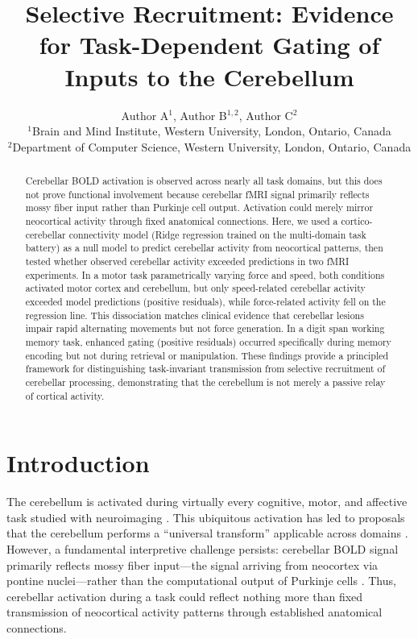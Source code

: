 \documentclass[11pt]{article}
\title{Selective Recruitment: Evidence for Task-Dependent Gating of Inputs to the Cerebellum}
\author{Author A$^{1}$, Author B$^{1,2}$, Author C$^{2}$\\
\small $^{1}$Brain and Mind Institute, Western University, London, Ontario, Canada\\
\small $^{2}$Department of Computer Science, Western University, London, Ontario, Canada}
\date{}
\begin{document}
\maketitle

\begin{abstract}
Cerebellar BOLD activation is observed across nearly all task domains, but this does not prove functional involvement because cerebellar fMRI signal primarily reflects mossy fiber input rather than Purkinje cell output. Activation could merely mirror neocortical activity through fixed anatomical connections. Here, we used a cortico-cerebellar connectivity model (Ridge regression trained on the multi-domain task battery) as a null model to predict cerebellar activity from neocortical patterns, then tested whether observed cerebellar activity exceeded predictions in two fMRI experiments. In a motor task parametrically varying force and speed, both conditions activated motor cortex and cerebellum, but only speed-related cerebellar activity exceeded model predictions (positive residuals), while force-related activity fell on the regression line. This dissociation matches clinical evidence that cerebellar lesions impair rapid alternating movements but not force generation. In a digit span working memory task, enhanced gating (positive residuals) occurred specifically during memory encoding but not during retrieval or manipulation. These findings provide a principled framework for distinguishing task-invariant transmission from selective recruitment of cerebellar processing, demonstrating that the cerebellum is not merely a passive relay of cortical activity.
\end{abstract}

\section{Introduction}

The cerebellum is activated during virtually every cognitive, motor, and affective task studied with neuroimaging \citep{stoodley2012functional, buckner2011organization, schmahmann2019cerebellum}. This ubiquitous activation has led to proposals that the cerebellum performs a ``universal transform'' applicable across domains \citep{diedrichsen2019universal, ito2008control, wolpert1998internal}. However, a fundamental interpretive challenge persists: cerebellar BOLD signal primarily reflects mossy fiber input---the signal arriving from neocortex via pontine nuclei---rather than the computational output of Purkinje cells \citep{ramnani2006cerebellum, glickstein2011cerebellum}. Thus, cerebellar activation during a task could reflect nothing more than fixed transmission of neocortical activity patterns through established anatomical connections.
\end{document}
